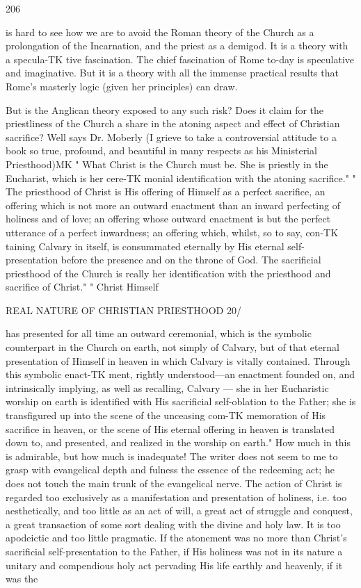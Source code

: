 \documentclass[12pt,a5paper,oneside]{book}
\begin{document}
{{206 



is hard to see how we are to avoid the Roman theory 
of the Church as a prolongation of the Incarnation, and 
the priest as a demigod. It is a theory with a specula-TK
tive fascination. The chief fascination of Rome to-day 
is speculative and imaginative. But it is a theory 
with all the immense practical results that Rome's 
masterly logic (given her principles) can draw. 

But is the Anglican theory exposed to any such 
risk? Does it claim for the priestliness of the Church 
a share in the atoning aspect and effect of Christian 
sacrifice? Well says Dr. Moberly (I grieve to take 
a controversial attitude to a book so true, profound, 
and beautiful in many respects as his Ministerial 
Priesthood)MK " What Christ is the Church must be. 
She is priestly in the Eucharist, which is her cere-TK
monial identification with the atoning sacrifice." 
" The priesthood of Christ is His offering of Himself 
as a perfect sacrifice, an offering which is not more 
an outward enactment than an inward perfecting of 
holiness and of love; an offering whose outward 
enactment is but the perfect utterance of a perfect 
inwardness; an offering which, whilst, so to say, con-TK
taining Calvary in itself, is consummated eternally by 
His eternal self-presentation before the presence and 
on the throne of God. The sacrificial priesthood 
of the Church is really her identification with the 
priesthood and sacrifice of Christ." " Christ Himself 



REAL NATURE OF CHRISTIAN PRIESTHOOD 20/ 

has presented for all time an outward ceremonial, 
which is the symbolic counterpart in the Church on 
earth, not simply of Calvary, but of that eternal 
presentation of Himself in heaven in which Calvary 
is vitally contained. Through this symbolic enact-TK
ment, rightly understood---an enactment founded on, 
and intrinsically implying, as well as recalling, Calvary 
— she in her Eucharistic worship on earth is identified 
with His sacrificial self-oblation to the Father; she is 
transfigured up into the scene of the unceasing com-TK
memoration of His sacrifice in heaven, or the scene of 
His eternal offering in heaven is translated down to, 
and presented, and realized in the worship on earth." 
How much in this is admirable, but how much is 
inadequate! The writer does not seem to me to grasp 
with evangelical depth and fulness the essence of the 
redeeming act; he does not touch the main trunk of 
the evangelical nerve. The action of Christ is regarded 
too exclusively as a manifestation and presentation of 
holiness, i.e. too aesthetically, and too little as an act 
of will, a great act of struggle and conquest, a great 
transaction of some sort dealing with the divine and 
holy law. It is too apodeictic and too little pragmatic. 
If the atonement was no more than Christ's sacrificial 
self-presentation to the Father, if His holiness was 
not in its nature a unitary and compendious holy act 
pervading His life earthly and heavenly, if it was the 



}}
\end{document}
